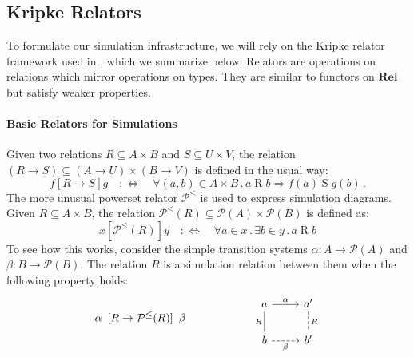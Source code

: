 \documentclass[acmsmall,screen,review,anonymous]{acmart}
\newcommand{\kw}[1]{\ensuremath{ \mathsf{#1} }}
\newcommand{\ifr}[1]{\mathrel{[{#1}]}}
\begin{document}


\subsection{Kripke Relators} %

To formulate our simulation infrastructure,
we will rely on the Kripke relator framework
used in \citet{compcerto},
which we summarize below.
Relators are operations on relations
which mirror operations on types.
They are similar to functors on $\mathbf{Rel}$
but satisfy weaker properties.

\paragraph{Basic Relators for Simulations}

Given two relations
$R \subseteq A \times B$ and
$S \subseteq U \times V$,
the relation
$(R \rightarrow S) \subseteq
 (A \rightarrow U) \times
 (B \rightarrow V)$
is defined in the usual way:
\[
  f \ifr{R \rightarrow S} g
  \quad:\Leftrightarrow\quad
  \forall (a, b) \in A \times B \mathbin.
    a \mathrel{R} b \Rightarrow
    f(a) \mathrel{S} g(b)
  \,.
\]
The more unusual powerset relator $\mathcal{P}^\le$
is used to express simulation diagrams.
Given $R \subseteq A \times B$,
the relation
$\mathcal{P}^\le(R) \subseteq \mathcal{P}(A) \times \mathcal{P}(B)$
is defined as:
\[
  x \ifr{\mathcal{P}^\le(R)} y
  \quad:\Leftrightarrow\quad
  \forall a \in x \mathbin.
  \exists b \in y \mathbin.
  a \mathrel{R} b
\]
To see how this works,
consider the simple transition systems
$\alpha : A \rightarrow \mathcal{P}(A)$
and
$\beta : B \rightarrow \mathcal{P}(B)$.
The relation $R$ is a simulation relation between them
when the following property holds:
\[
  \alpha \:\ifr{R \rightarrow \mathcal{P}^\le(R)}\: \beta
  \qquad\qquad\qquad
  \begin{tikzcd}
    a \ar[r, "\alpha"] \ar[d, dash, "R"'] &
    a' \ar[d, dash, dashed, "R"] \\
    b \ar[r, dashed, "\beta"'] &
    b'
  \end{tikzcd}
\]
\end{document}
